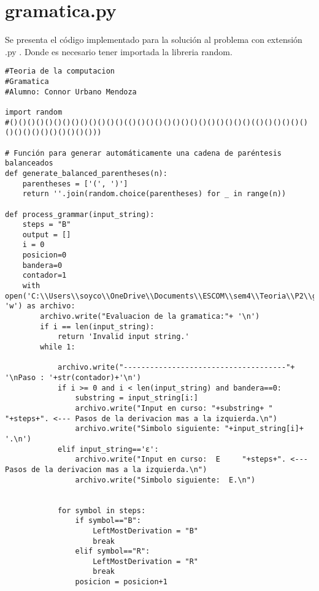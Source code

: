 \section{gramatica.py}
Se presenta el código implementado para la solución al problema con extensión .py . Donde es necesario tener importada la libreria random. \newline
\\
\begin{lstlisting}
#Teoria de la computacion
#Gramatica
#Alumno: Connor Urbano Mendoza

import random
#()()()()()()()()()()()()()(()()()()()()()()()()()()()()(()()()()()()()()()()()()()()()()))

# Función para generar automáticamente una cadena de paréntesis balanceados
def generate_balanced_parentheses(n):
    parentheses = ['(', ')']
    return ''.join(random.choice(parentheses) for _ in range(n))

def process_grammar(input_string):
    steps = "B"
    output = []
    i = 0
    posicion=0
    bandera=0
    contador=1
    with open('C:\\Users\\soyco\\OneDrive\\Documents\\ESCOM\\sem4\\Teoria\\P2\\gramatica\\output\\evaluacion.txt', 'w') as archivo:
        archivo.write("Evaluacion de la gramatica:"+ '\n')
        if i == len(input_string):
            return 'Invalid input string.'
        while 1:
            
            archivo.write("-------------------------------------"+ '\nPaso : '+str(contador)+'\n')
            if i >= 0 and i < len(input_string) and bandera==0:
                substring = input_string[i:]
                archivo.write("Input en curso: "+substring+ "     "+steps+". <--- Pasos de la derivacion mas a la izquierda.\n")
                archivo.write("Simbolo siguiente: "+input_string[i]+ '.\n')
            elif input_string=='ε':
                archivo.write("Input en curso:  E     "+steps+". <--- Pasos de la derivacion mas a la izquierda.\n")
                archivo.write("Simbolo siguiente:  E.\n")
            

            for symbol in steps:
                if symbol=="B":
                    LeftMostDerivation = "B"
                    break
                elif symbol=="R":
                    LeftMostDerivation = "R"
                    break
                posicion = posicion+1
            

\end{lstlisting}

